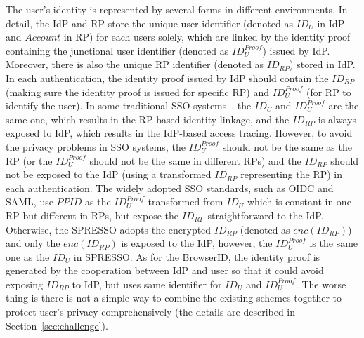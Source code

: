 The user's identity is represented by several forms in different environments. In detail, the IdP and RP store the unique user identifier (denoted as $ID_U$ in IdP and $Account$ in RP) for each users solely, which are linked by the identity proof containing the junctional user identifier (denoted as $ID_U^{Proof}$) issued by IdP. Moreover, there is also the unique RP identifier (denoted as $ID_{RP}$) stored in IdP. In each authentication, the identity proof issued by IdP should contain the $ID_{RP}$ (making sure the identity proof is issued for specific RP) and $ID_U^{Proof}$ (for RP to identify the user). In some traditional SSO systems~\cite{rfc6749}, the $ID_U$ and $ID_U^{Proof}$ are the same one, which results in the RP-based identity linkage, and the $ID_{RP}$ is always exposed to IdP, which results in the IdP-based access tracing. However, to avoid the privacy problems in SSO systems, the $ID_U^{Proof}$ should not be the same as the RP (or the $ID_U^{Proof}$ should not be the same in different RPs) and the $ID_{RP}$ should not be exposed to the IdP (using a transformed $ID_{RP}$ representing the RP) in each authentication. The widely adopted SSO standards, such as OIDC and SAML, use $PPID$ as the $ID_U^{Proof}$ transformed from $ID_U$ which is constant in one RP but different in RPs, but expose the $ID_{RP}$ straightforward to the IdP. Otherwise, the SPRESSO adopts the encrypted $ID_{RP}$ (denoted as $enc(ID_{RP})$) and only the $enc(ID_{RP})$ is exposed to the IdP, however, the $ID_U^{Proof}$ is the same one as the $ID_U$ in SPRESSO. As for the BrowserID, the identity proof is generated by the cooperation between IdP and user so that it could avoid exposing $ID_{RP}$ to IdP, but uses same identifier for $ID_U$ and $ID_U^{Proof}$. The worse thing is there is not a simple way to combine the existing schemes together to protect user's privacy comprehensively (the details are described in Section~\ref{sec:challenge}).

